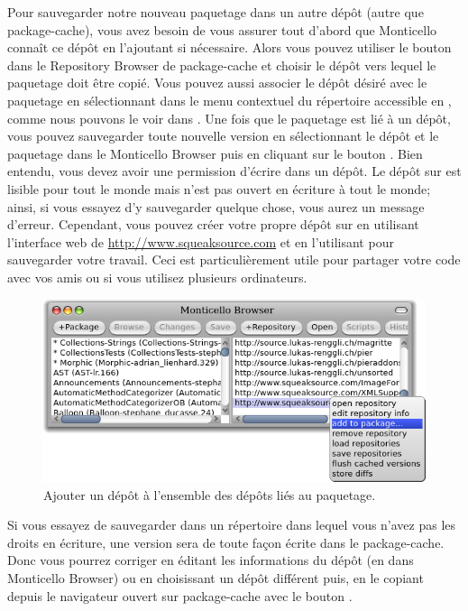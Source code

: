 \documentclass[a4paper,10pt,twoside]{book}
\begin{document}
Pour sauvegarder notre nouveau paquetage dans un autre
dépôt (autre que package-cache), vous avez besoin de vous 
assurer tout d'abord que Monticello connaît
ce dépôt en l'ajoutant si nécessaire.
Alors vous pouvez utiliser le bouton  dans le 
Repository Browser de package-cache et choisir le dépôt vers lequel
le paquetage doit être copié.
Vous pouvez aussi associer le dépôt désiré avec le paquetage
en sélectionnant  
dans le menu contextuel du répertoire accessible en \actclickant,
comme nous pouvons le voir dans .
Une fois que le paquetage est lié à un dépôt, vous pouvez sauvegarder
toute nouvelle version en sélectionnant le dépôt et le paquetage
dans le Monticello Browser puis en cliquant sur le bouton 
 .  
Bien entendu, vous devez avoir une permission d'écrire dans un dépôt.
Le dépôt  sur \emphind{\sqsrc} est
lisible pour tout le monde mais n'est pas ouvert en écriture à tout le monde; 
ainsi, si vous essayez d'y sauvegarder quelque chose, vous aurez un message d'erreur.
Cependant, vous pouvez créer votre propre dépôt sur 
\sqsrc en utilisant l'interface web de \url{http://www.squeaksource.com} et 
en l'utilisant pour sauvegarder votre travail.
Ceci est particulièrement utile pour partager votre code avec vos amis ou
si vous utilisez plusieurs ordinateurs.

\begin{figure}[tbp]
	\begin{center}
		\includegraphics[width=\textwidth]{MCaddToPackage}
	\end{center}
	\caption{Ajouter un dépôt à l'ensemble des dépôts liés
au paquetage.}
\end{figure}

Si vous essayez de sauvegarder dans un répertoire dans lequel vous n'avez
pas les droits en écriture, une version sera de toute façon écrite
dans le package-cache.
Donc vous pourrez corriger en éditant les informations du dépôt
(en \actclickant{} dans Monticello Browser) ou
en choisissant un dépôt différent puis, en le copiant
depuis le navigateur ouvert sur package-cache avec le bouton .
\end{document}
